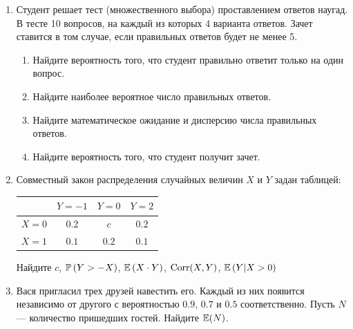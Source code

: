 \begin{enumerate}

\item Студент решает тест (множественного выбора) проставлением ответов наугад.
В тесте 10 вопросов, на каждый из которых 4 варианта ответов. Зачет ставится в
том случае, если правильных ответов будет не менее 5.
\begin{enumerate}
\item Найдите вероятность того, что студент правильно ответит только на один вопрос.
\item Найдите наиболее вероятное число правильных ответов.
\item Найдите математическое ожидание и дисперсию числа правильных ответов.
\item Найдите вероятность того, что студент получит зачет.
\end{enumerate}


\item Совместный закон распределения случайных величин  $X$  и  $Y$ задан таблицей:

\begin{center}
\begin{tabular}{@{}cccc@{}}
\toprule
    & $Y=-1$ & $Y=0$ & $Y=2$ \\ \midrule
$X=0$ & $0.2$  & $c$   & $0.2$ \\
$X=1$ & $0.1$  & $0.2$ & $0.1$ \\ \bottomrule
\end{tabular}
\end{center}

Найдите  $c$,  $\P\left(Y > - X \right)$,  $\E\left(X \cdot Y \right)$, $\Corr(X, Y)$,
$\E\left(Y| X > 0\right)$

\item Вася пригласил трех друзей навестить его. Каждый из них появится независимо
от другого с вероятностью $0.9$, $0.7$ и $0.5$ соответственно. Пусть $N$ — количество
пришедших гостей. Найдите $\E(N)$.


\end{enumerate}
